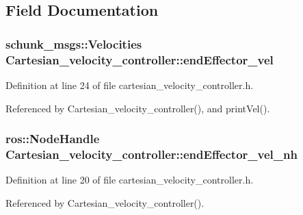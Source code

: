 \subsection{Field Documentation}
\hypertarget{classCartesian__velocity__controller_ae771d963a90ad7b844c4c3a821ce5f39}{
\subsubsection[{end\-Effector\-\_\-vel}]{\setlength{\rightskip}{0pt plus 5cm}schunk\-\_\-msgs\-::\-Velocities Cartesian\-\_\-velocity\-\_\-controller\-::end\-Effector\-\_\-vel\hspace{0.3cm}{\ttfamily [protected]}}}\label{classCartesian__velocity__controller_ae771d963a90ad7b844c4c3a821ce5f39}


Definition at line 24 of file cartesian\-\_\-velocity\-\_\-controller.\-h.



Referenced by Cartesian\-\_\-velocity\-\_\-controller(), and print\-Vel().

\hypertarget{classCartesian__velocity__controller_a01cbe7f951c69ded8604e552a0a706e0}{
\subsubsection[{end\-Effector\-\_\-vel\-\_\-nh}]{\setlength{\rightskip}{0pt plus 5cm}ros\-::\-Node\-Handle Cartesian\-\_\-velocity\-\_\-controller\-::end\-Effector\-\_\-vel\-\_\-nh\hspace{0.3cm}{\ttfamily [protected]}}}\label{classCartesian__velocity__controller_a01cbe7f951c69ded8604e552a0a706e0}


Definition at line 20 of file cartesian\-\_\-velocity\-\_\-controller.\-h.



Referenced by Cartesian\-\_\-velocity\-\_\-controller().

